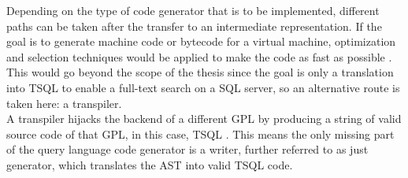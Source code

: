 Depending on the type of code generator that is to be implemented, different paths can be taken after the transfer to an intermediate representation. If the goal is to generate machine code or bytecode for a virtual machine, optimization and selection techniques would be applied to make the code as fast as possible \parencite[cf.][p. 15]{nystrom_crafting_2021}.\\
This would go beyond the scope of the thesis since the goal is only a translation into \ac{TSQL} to enable a full-text search on a \ac{SQL} server, so an alternative route is taken here: a transpiler.\\
A transpiler hijacks the backend of a different \ac{GPL} by producing a string of valid source code of that \ac{GPL}, in this case, \ac{TSQL} \parencite[cf.][p. 17]{nystrom_crafting_2021}. This means the only missing part of the query language code generator is a writer, further referred to as just generator, which translates the \ac{AST} into valid \ac{TSQL} code.